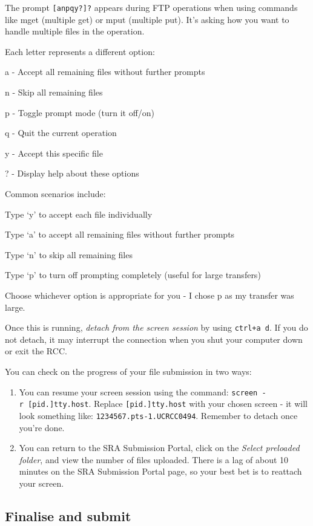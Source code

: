 \documentclass[
]{article}
\begin{document}
The prompt \texttt{{[}anpqy?{]}?} appears during FTP operations when
using commands like mget (multiple get) or mput (multiple put). It's
asking how you want to handle multiple files in the operation.

Each letter represents a different option:

a - Accept all remaining files without further prompts

n - Skip all remaining files

p - Toggle prompt mode (turn it off/on)

q - Quit the current operation

y - Accept this specific file

? - Display help about these options

Common scenarios include:

Type `y' to accept each file individually

Type `a' to accept all remaining files without further prompts

Type `n' to skip all remaining files

Type `p' to turn off prompting completely (useful for large transfers)

Choose whichever option is appropriate for you - I chose p as my
transfer was large.

Once this is running, \emph{detach from the screen session} by using
\texttt{ctrl+a\ d}. If you do not detach, it may interrupt the
connection when you shut your computer down or exit the RCC.

You can check on the progress of your file submission in two ways:

\begin{enumerate}
\def\labelenumi{\arabic{enumi}.}
\item
  You can resume your screen session using the command:
  \texttt{screen\ -r\ {[}pid.{]}tty.host}. Replace
  \texttt{{[}pid.{]}tty.host} with your chosen screen - it will look
  something like: \texttt{1234567.pts-1.UCRCC0494}. Remember to detach
  once you're done.
\item
  You can return to the SRA Submission Portal, click on the \emph{Select
  preloaded folder}, and view the number of files uploaded. There is a
  lag of about 10 minutes on the SRA Submission Portal page, so your
  best bet is to reattach your screen.
\end{enumerate}

\hypertarget{finalise-and-submit}{%
\subsection{Finalise and submit}\label{finalise-and-submit}}
\end{document}
